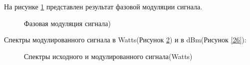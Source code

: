 \documentclass[a4paper,14pt]{extarticle}
\begin{document}
На рисунке \ref{24} представлен результат фазовой модуляции сигнала.

\begin{figure}[H]
\caption{Фазовая модуляция сигнала)}
\label{24}
\end{figure}

Спектры модулированного сигнала в Watts(Рисунок \ref{25}) и в dBm(Рисунок \ref{26}):

\begin{figure}[H]
\caption{Спектры исходного и модулированного сигнала(Watts)}
\label{25}
\end{figure}
\end{document}
